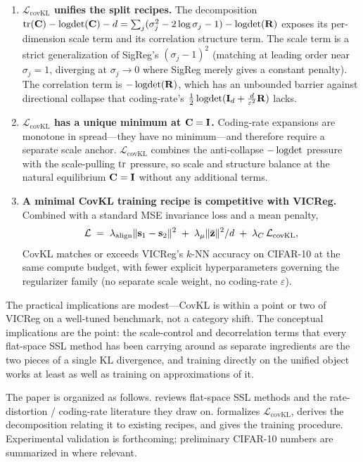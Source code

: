 \begin{enumerate}
    \item \textbf{$\mathcal{L}_\text{covKL}$ unifies the split recipes.} The decomposition $\operatorname{tr}(\mathbf{C}) - \operatorname{logdet}(\mathbf{C}) - d = \sum_j(\sigma_j^2 - 2\log\sigma_j - 1) - \operatorname{logdet}(\mathbf{R})$ exposes its per-dimension scale term and its correlation structure term. The scale term is a strict generalization of SigReg's $(\sigma_j-1)^2$ (matching at leading order near $\sigma_j=1$, diverging at $\sigma_j \to 0$ where SigReg merely gives a constant penalty). The correlation term is $-\operatorname{logdet}(\mathbf{R})$, which has an unbounded barrier against directional collapse that coding-rate's $\tfrac{1}{2}\operatorname{logdet}(\mathbf{I}_d + \tfrac{d}{\varepsilon^2}\mathbf{R})$ lacks.
    \item \textbf{$\mathcal{L}_\text{covKL}$ has a unique minimum at $\mathbf{C} = \mathbf{I}$.} Coding-rate expansions are monotone in spread---they have no minimum---and therefore require a separate scale anchor. $\mathcal{L}_\text{covKL}$ combines the anti-collapse $-\operatorname{logdet}$ pressure with the scale-pulling $\operatorname{tr}$ pressure, so scale and structure balance at the natural equilibrium $\mathbf{C} = \mathbf{I}$ without any additional terms.
    \item \textbf{A minimal CovKL training recipe is competitive with VICReg.} Combined with a standard MSE invariance loss and a mean penalty,
    \begin{equation}
    \label{eq:intro_loss}
        \mathcal{L} \;=\; \lambda_\text{align}\|\mathbf{s}_1 - \mathbf{s}_2\|^2 \;+\; \lambda_\mu \|\bar{\mathbf{z}}\|^2/d \;+\; \lambda_C\,\mathcal{L}_\text{covKL},
    \end{equation}
    CovKL matches or exceeds VICReg's $k$-NN accuracy on CIFAR-10 at the same compute budget, with fewer explicit hyperparameters governing the regularizer family (no separate scale weight, no coding-rate $\varepsilon$).
\end{enumerate}

The practical implications are modest---CovKL is within a point or two of VICReg on a well-tuned benchmark, not a category shift. The conceptual implications are the point: the scale-control and decorrelation terms that every flat-space SSL method has been carrying around as separate ingredients are the two pieces of a single KL divergence, and training directly on the unified object works at least as well as training on approximations of it.

The paper is organized as follows.  reviews flat-space SSL methods and the rate-distortion / coding-rate literature they draw on.  formalizes $\mathcal{L}_\text{covKL}$, derives the decomposition relating it to existing recipes, and gives the training procedure. Experimental validation is forthcoming; preliminary CIFAR-10 numbers are summarized in  where relevant.
